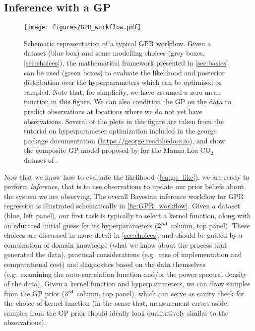 \documentclass[letterpaper]{ar-1col}
\begin{document}
\subsection{Inference with a GP}\label{sec:gp-inf}

\begin{figure}[ht]
  \centering
  \texttt{[image: figures/GPR\_workflow.pdf]}
  \caption{Schematic representation of a typical GPR workflow. Given a dataset (blue box) and some modelling choices (grey boxes, \autoref{sec:choices}), the mathematical framework presented in \autoref{sec:basics} can be used (green boxes) to evaluate the likelihood and posterior distribution over the hyperparameters which can be optimised or sampled. Note that, for simplicity, we have assumed a zero mean function in this figure. We can also condition the GP on the data to predict observations at locations where we do not yet have observations. Several of the plots in this figure are taken from the 
  tutorial on hyperparameter optimization included in the {\sc george} package documentation (\url{https://george.readthedocs.io}), and show the composite GP model proposed by \citet{gpml} for the Mauna Loa CO$_2$ dataset of \citet{MaunaLoaCO2}.}  
  \label{fig:GPR_workflow}
\end{figure}

Now that we know how to evaluate the likelihood (\autoref{eq:gp_like}), we are ready to perform \textit{inference}, that is to use observations to update our prior beliefs about the system we are observing. The overall Bayesian inference workflow for GPR regression is illustrated schematically in \autoref{fig:GPR_workflow}. Given a dataset (blue, left panel), our first task is typically to select a kernel function, along with an educated initial guess for its hyperparameters ($2^{\rm nd}$ column, top panel). These choices are discussed in more detail in \autoref{sec:choices}, and should be guided by a combination of domain knowledge (what we know about the process that generated the data), practical considerations (e.g.\ ease of implementation and computational cost) and diagnostics based on the data themselves (e.g.\ examining the auto-correlation function and/or the power spectral density of the data). Given a kernel function and hyperparameters, we can draw samples from the GP prior ($3^{\rm rd}$ column, top panel), which can serve as sanity check for the choice of kernel function (in the sense that, measurement errors aside, samples from the GP prior should ideally look qualitatively similar to the observations). 
\end{document}
